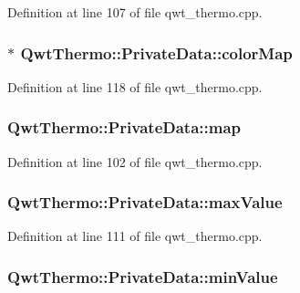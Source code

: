 Definition at line 107 of file qwt\-\_\-thermo.\-cpp.

\hypertarget{class_qwt_thermo_1_1_private_data_a8d883ae5e828303d9cbcc8ec4eed6d5f}{
\subsubsection[{color\-Map}]{$\ast$ Qwt\-Thermo\-::\-Private\-Data\-::color\-Map}}\label{class_qwt_thermo_1_1_private_data_a8d883ae5e828303d9cbcc8ec4eed6d5f}


Definition at line 118 of file qwt\-\_\-thermo.\-cpp.

\hypertarget{class_qwt_thermo_1_1_private_data_a156edf38173bd2048304cd7b98071d4c}{
\subsubsection[{map}]{ Qwt\-Thermo\-::\-Private\-Data\-::map}}\label{class_qwt_thermo_1_1_private_data_a156edf38173bd2048304cd7b98071d4c}


Definition at line 102 of file qwt\-\_\-thermo.\-cpp.

\hypertarget{class_qwt_thermo_1_1_private_data_ad869a6978ba52b734fd6db89f5726edf}{
\subsubsection[{max\-Value}]{ Qwt\-Thermo\-::\-Private\-Data\-::max\-Value}}\label{class_qwt_thermo_1_1_private_data_ad869a6978ba52b734fd6db89f5726edf}


Definition at line 111 of file qwt\-\_\-thermo.\-cpp.

\hypertarget{class_qwt_thermo_1_1_private_data_a91c0c5bc4891f432c9f086349ad33489}{
\subsubsection[{min\-Value}]{ Qwt\-Thermo\-::\-Private\-Data\-::min\-Value}}\label{class_qwt_thermo_1_1_private_data_a91c0c5bc4891f432c9f086349ad33489}


